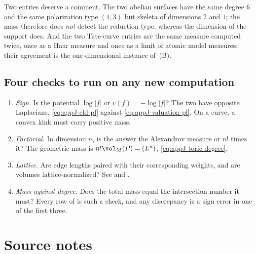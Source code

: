 Two entries deserve a comment.  The two abelian surfaces have the same
degree $6$ and the same polarization type $(1,3)$ but skeleta of
dimensions $2$ and $1$; the mass therefore does \emph{not} detect the
reduction type, whereas the dimension of the support does.  And the two
Tate-curve entries are the same measure computed twice, once as a Haar
measure and once as a limit of atomic model measures; their agreement is the
one-dimensional instance of
\,(B).

\subsection{Four checks to run on any new computation}
\label{sec:ch19-checks}

\begin{enumerate}
\item \emph{Sign.}  Is the potential $\log|f|$ or $v(f)=-\log|f|$?  The
 two have opposite Laplacians, \eqref{eq:appJ-cld-pl} against
 \eqref{eq:appJ-valuation-pl}.  On a curve, a convex kink must carry
 positive mass.
\item \emph{Factorial.}  In dimension $n$, is the answer the Alexandrov
 measure or $n!$ times it?  The geometric mass is $n!\vol_M(P)=(L^n)$,
 \eqref{eq:appJ-toric-degree}.
\item \emph{Lattice.}  Are edge lengths paired with their
 corresponding weights, and are volumes lattice-normalized?
 See  and
 .
\item \emph{Mass against degree.}  Does the total mass equal the
 intersection number it must?  Every row of
  is such a check, and any discrepancy is a sign
 error in one of the first three.
\end{enumerate}

\section*{Source notes}

